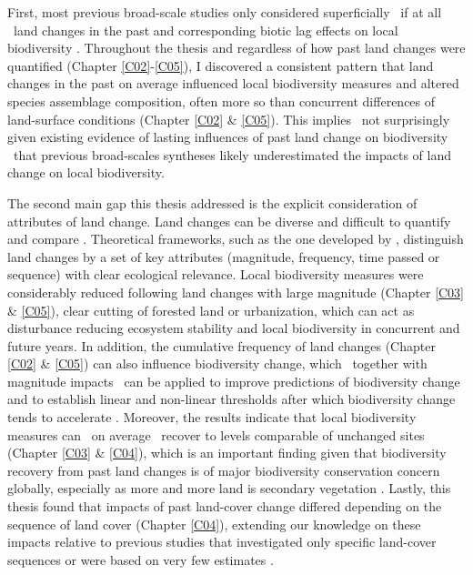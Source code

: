First, most previous broad-scale studies only considered superficially \textendash\ if at all \textendash\ land changes in the past \citep{Alkemade2009,Murphy2014,Newbold2015} and corresponding biotic lag effects on local biodiversity \citep{Dullinger2013,Hylander2013}. Throughout the thesis and regardless of how past land changes were quantified (Chapter \ref{C02}-\ref{C05}), I discovered a consistent pattern that land changes in the past on average influenced local biodiversity measures and altered species assemblage composition, often more so than concurrent differences of land-surface conditions (Chapter \ref{C02} \& \ref{C05}). This implies \textendash\ not surprisingly given existing evidence of lasting influences of past land change on biodiversity \citep{Foster2003,Ewers2013,Perring2015} \textendash\ that previous broad-scales syntheses \citep{Murphy2014,Newbold2015,Alroy2017} likely underestimated the impacts of land change on local biodiversity. 

The second main gap this thesis addressed is the explicit consideration of attributes of land change. Land changes can be diverse and difficult to quantify and compare \citep{Kleyer2007}. Theoretical frameworks, such as the one developed by \cite{Watson2014}, distinguish land changes by a set of key attributes (\eg magnitude, frequency, time passed or sequence) with clear ecological relevance. Local biodiversity measures were considerably reduced following land changes with large magnitude (Chapter \ref{C03} \& \ref{C05}), \eg clear cutting of forested land or urbanization, which can act as disturbance \citep{Scheffer2001,Scheffer2003} reducing ecosystem stability \citep{Pimm1984,Hautier2015} and local biodiversity in concurrent and future years. In addition, the cumulative frequency of land changes (Chapter \ref{C02} \& \ref{C05}) can also influence biodiversity change, which \textendash\ together with magnitude impacts \textendash\ can be applied to improve predictions of biodiversity change \citep{Ewers2009,Ewers2013} and to establish linear and non-linear thresholds after which biodiversity change tends to accelerate \citep{VanderHoek2013,Gutzwiller2015}. Moreover, the results indicate that local biodiversity measures can \textendash\ on average \textendash\ recover to levels comparable of unchanged sites (Chapter \ref{C03} \& \ref{C04}), which is an important finding given that biodiversity recovery from past land changes is of major biodiversity conservation concern globally, especially as more and more land is secondary vegetation \citep{Chazdon2003,Jones2018}. Lastly, this thesis found that impacts of past land-cover change differed depending on the sequence of land cover (Chapter \ref{C04}), extending our knowledge on these impacts relative to previous studies that investigated only specific land-cover sequences or were based on very few estimates \citep{Foster2003,Bremer2010,Watson2014}.

